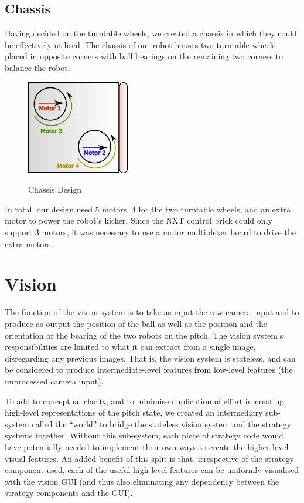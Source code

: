 \documentclass[12pt,a4paper,notitlepage,twocolumn]{report}
\begin{document}
\subsection*{Chassis}
Having decided on the turntable wheels, we created a chassis in which
they could be effectively utilised. The chassis of our robot houses
two turntable wheels placed in opposite corners with ball bearings on
the remaining two corners to balance the robot.

\begin{figure} [ht]
  \centering
  \includegraphics[width=45mm]{chassis.png}
  \label{fig:chassis}
  \caption{Chassis Design}
\end{figure}

In total, our design used 5 motors, 4 for the two turntable wheels,
and an extra motor to power the robot’s kicker. Since the NXT control
brick could only support 3 motors, it was necessary to use a motor
multiplexer board to drive the extra motors.

\section*{Vision}
The function of the vision system is to take as input the raw camera
input and to produce as output the position of the ball as well as the
position and the orientation or the bearing of the two robots on the
pitch. The vision system’s responsibilities are limited to what it can
extract from a single image, disregarding any previous images. That
is, the vision system is stateless, and can be considered to produce
intermediate-level features from low-level features (the unprocessed
camera input).

To add to conceptual clarity, and to minimise duplication of effort in
creating high-level representations of the pitch state, we created an
intermediary sub-system called the “world” to bridge the stateless
vision system and the strategy systems together. Without this
sub-system, each piece of strategy code would have potentially needed
to implement their own ways to create the higher-level visual
features. An added benefit of this split is that, irrespective of the
strategy component used, each of the useful high-level features can be
uniformly visualised with the vision GUI (and thus also eliminating
any dependency between the strategy components and the GUI).
\end{document}
